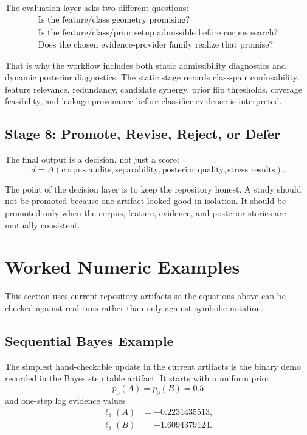 \documentclass[11pt]{article}
\begin{document}
The evaluation layer asks two different questions:
\begin{align}
\text{Is the feature/class geometry promising?} \\
\text{Is the feature/class/prior setup admissible before corpus search?} \\
\text{Does the chosen evidence-provider family realize that promise?}
\end{align}

That is why the workflow includes both static admissibility diagnostics and dynamic posterior diagnostics. The static stage records class-pair confusability, feature relevance, redundancy, candidate synergy, prior flip thresholds, coverage feasibility, and leakage provenance before classifier evidence is interpreted.

\subsection{Stage 8: Promote, Revise, Reject, or Defer}
The final output is a decision, not just a score:
\begin{equation}
d = \Delta(
\text{corpus audits},
\text{separability},
\text{posterior quality},
\text{stress results}
).
\end{equation}

The point of the decision layer is to keep the repository honest. A study should not be promoted because one artifact looked good in isolation. It should be promoted only when the corpus, feature, evidence, and posterior stories are mutually consistent.

\section{Worked Numeric Examples}
This section uses current repository artifacts so the equations above can be checked against real runs rather than only against symbolic notation.

\subsection{Sequential Bayes Example}
The simplest hand-checkable update in the current artifacts is the binary demo recorded in the Bayes step table artifact. It starts with a uniform prior
\begin{equation}
p_0(A) = p_0(B) = 0.5
\end{equation}
and one-step log evidence values
\begin{align}
\ell_1(A) &= -0.2231435513, \\
\ell_1(B) &= -1.6094379124.
\end{align}
\end{document}
